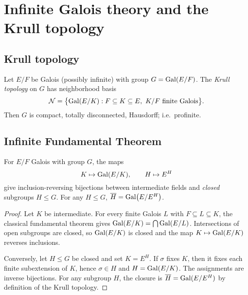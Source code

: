 \section{Infinite Galois theory and the Krull topology}\label{sec:infinite-galois}

\subsection{Krull topology}
\begin{definition}
Let $E/F$ be Galois (possibly infinite) with group $G=\operatorname{Gal}(E/F)$. The \emph{Krull topology} on $G$ has neighborhood basis
\[
\mathcal{N}=\bigl\{\operatorname{Gal}(E/K): F\subseteq K\subseteq E,\ K/F\ \text{finite Galois}\bigr\}.
\]
Then $G$ is compact, totally disconnected, Hausdorff; i.e.\ profinite.
\end{definition}

\subsection{Infinite Fundamental Theorem}
\begin{theorem}
For $E/F$ Galois with group $G$, the maps
\[
K\mapsto \operatorname{Gal}(E/K),\qquad H\mapsto E^{H}
\]
give inclusion-reversing bijections between intermediate fields and \emph{closed} subgroups $H\le G$. For any $H\le G$, $\overline{H}=\operatorname{Gal}\bigl(E/E^{H}\bigr)$.
\end{theorem}
\begin{proof}
Let $K$ be intermediate. For every finite Galois $L$ with $F\subseteq L\subseteq K$, the classical fundamental theorem gives $\operatorname{Gal}(E/K)=\bigcap\operatorname{Gal}(E/L)$. Intersections of open subgroups are closed, so $\operatorname{Gal}(E/K)$ is closed and the map $K\mapsto\operatorname{Gal}(E/K)$ reverses inclusions.

Conversely, let $H\le G$ be closed and set $K=E^{H}$. If $\sigma$ fixes $K$, then it fixes each finite subextension of $K$, hence $\sigma\in H$ and $H=\operatorname{Gal}(E/K)$. The assignments are inverse bijections. For any subgroup $H$, the closure is $\overline{H}=\operatorname{Gal}(E/E^{H})$ by definition of the Krull topology.
\end{proof}

